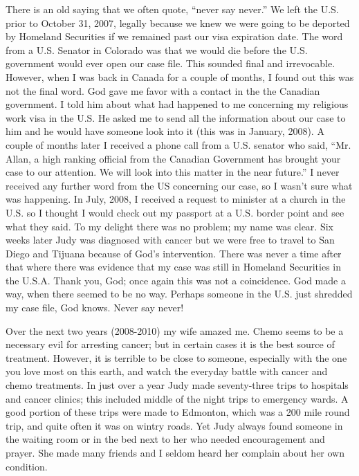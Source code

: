 \documentclass[oneside]{book}
\begin{document}
There is an old saying that we often quote, “never say never.” We left the U.S. prior to October 31, 2007, legally because we knew we were going to be deported by Homeland Securities if we remained past our visa expiration date. The word from a U.S. Senator in Colorado was that we would die before the U.S. government would ever open our case file. This sounded final and irrevocable. However, when I was back in Canada for a couple of months, I found out this was not the final word. God gave me favor with a contact in the the Canadian government. I told him about what had happened to me concerning my religious work visa in the U.S. He asked me to send all the information about our case to him and he would have someone look into it (this was in January, 2008).  A couple of months later I received a phone call from a U.S. senator who said, “Mr. Allan, a high ranking official from the Canadian Government has brought your case to our attention. We will look into this matter in the near future.” I never received any further word from the US concerning our case, so I wasn’t sure what was happening. In July, 2008, I received a request to minister at a church in the U.S. so I thought I would check out my passport at a U.S. border point and see what they said. To my delight there was no problem; my name was clear. Six weeks later Judy was diagnosed with cancer but we were free to travel to San Diego and Tijuana because of God’s intervention. There was never a time after that where there was evidence that my case was still in Homeland Securities in the U.S.A. Thank you, God; once again this was not a coincidence. God made a way, when there seemed to be no way. Perhaps someone in the U.S. just shredded my case file, God knows. Never say never!

Over the next two years (2008-2010) my wife amazed me. Chemo seems to be a necessary evil for arresting cancer; but in certain cases it is the best source of treatment. However, it is terrible to be close to someone, especially with the one you love most on this earth, and watch the everyday battle with cancer and chemo treatments. In just over a year Judy made seventy-three trips to hospitals and cancer clinics; this included middle of the night trips to emergency wards. A good portion of these trips were made to Edmonton, which was a 200 mile round trip, and quite often it was on wintry roads. Yet Judy always found someone in the waiting room or in the bed next to her who needed encouragement and prayer. She made many friends and I seldom heard her complain about her own condition.
\end{document}
